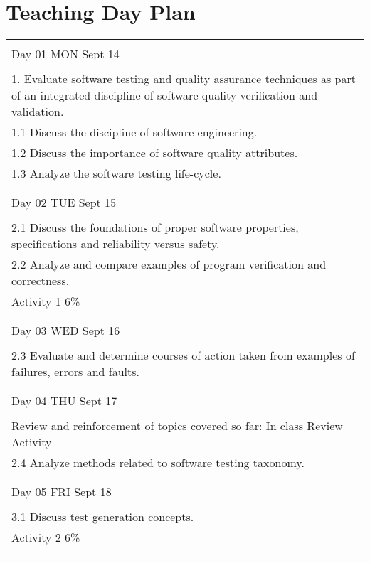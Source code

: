 
\newpage
\section * {Teaching Day Plan}

\begin{longtable}{ l  }
 \hline
    \\
    Day 01 MON Sept 14 \\ \\ 
     1. Evaluate software testing and quality assurance techniques as part of an integrated discipline of software quality verification and validation.\\
            1.1 Discuss the discipline of software engineering.\\
            1.2 Discuss the importance of software quality attributes.\\
            1.3 Analyze the software testing life-cycle.\\ \\
    \hline 
    \\         
    Day 02 TUE Sept 15 \\  \\ 
            2.1 Discuss the foundations of proper software properties, specifications and reliability versus safety. \\
            2.2 Analyze and compare examples of program verification and correctness. \\
		    Activity 1  6\% \\   \\   
    \hline 
    \\    Day 03 WED Sept 16 \\ \\ 
          2.3 Evaluate and determine courses of action taken from examples of failures, errors and faults. \\ \\ 
     \hline   
     \\       Day 04 THU Sept 17 \\    \\ 
        Review and reinforcement of topics covered so far: In class Review Activity \\
           2.4 Analyze methods related to software testing taxonomy. \\  \\ 
     \hline    
     \\        Day 05 FRI Sept 18 \\ \\ 
           3.1 Discuss test generation concepts. \\
             Activity 2  6\% \\ \\ 
      \newpage 
      \hline   
      

\end{longtable}
